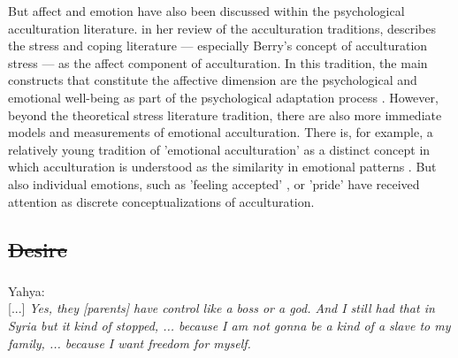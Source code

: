 \documentclass[man, 12pt, a4paper, mask]{apa7}
\providecommand{\DIFaddtex}[1]{{\protect\color{blue}\uwave{#1}}} %
\providecommand{\DIFdeltex}[1]{{\protect\color{red}\sout{#1}}}                      %
\providecommand{\DIFaddbegin}{} %
\providecommand{\DIFaddend}{} %
\providecommand{\DIFdelbegin}{} %
\providecommand{\DIFdelend}{} %
\providecommand{\DIFadd}[1]{\texorpdfstring{\DIFaddtex{#1}}{#1}} %
\providecommand{\DIFdel}[1]{\texorpdfstring{\DIFdeltex{#1}}{}} %
\newcommand{\DIFscaledelfig}{0.5}
\newlength{\DIFdelgraphicswidth} %
\newlength{\DIFdelgraphicsheight} %
\newcommand{\DIFaddincludegraphics}[2][]{{\color{blue}\fbox{\DIFOincludegraphics[#1]{#2}}}} %
\newcommand{\DIFdelincludegraphics}[2][]{%
\sbox{\DIFdelgraphicsbox}{\DIFOincludegraphics[#1]{#2}}%
\settoboxwidth{\DIFdelgraphicswidth}{\DIFdelgraphicsbox} %
\settoboxtotalheight{\DIFdelgraphicsheight}{\DIFdelgraphicsbox} %
\scalebox{\DIFscaledelfig}{%
\parbox[b]{\DIFdelgraphicswidth}{\usebox{\DIFdelgraphicsbox}\\[-\baselineskip] \rule{\DIFdelgraphicswidth}{0em}}\llap{\resizebox{\DIFdelgraphicswidth}{\DIFdelgraphicsheight}{%
\setlength{\unitlength}{\DIFdelgraphicswidth}%
\begin{picture}(1,1)%
\thicklines\linethickness{2pt} %
{\color[rgb]{1,0,0}\put(0,0){\framebox(1,1){}}}%
{\color[rgb]{1,0,0}\put(0,0){\line( 1,1){1}}}%
{\color[rgb]{1,0,0}\put(0,1){\line(1,-1){1}}}%
\end{picture}%
}\hspace*{3pt}}} %
} %
\DeclareRobustCommand{\DIFaddbegin}{\DIFOaddbegin \let\includegraphics\DIFaddincludegraphics} %
\DeclareRobustCommand{\DIFaddend}{\DIFOaddend \let\includegraphics\DIFOincludegraphics} %
\DeclareRobustCommand{\DIFdelbegin}{\DIFOdelbegin \let\includegraphics\DIFdelincludegraphics} %
\DeclareRobustCommand{\DIFdelend}{\DIFOaddend \let\includegraphics\DIFOincludegraphics} %
\begin{document}
But affect and emotion have also been discussed within the psychological acculturation literature. \citet{Ward2001} in her review of the acculturation traditions, describes the stress and coping literature --- especially Berry's concept of acculturation stress \citep{Berry1997b} --- as the affect component of acculturation. In this tradition, the main constructs that constitute the affective dimension are the psychological and emotional well-being as part of the psychological adaptation process \citep[including, for example, life satisfaction and depression;][]{Ward2019}. However, beyond the theoretical stress literature tradition, there are also more immediate models and measurements of emotional acculturation. There is, for example, a relatively young tradition of 'emotional acculturation' as a distinct concept in which acculturation is understood as the similarity in emotional patterns \citep[see][for a review]{DeLeersnyder2017}. But also individual emotions, such as 'feeling accepted' \citep{Jasini2018}, or 'pride' \citep{Suinn1995} have received attention as discrete conceptualizations of acculturation. 

\DIFdelbegin \subsection{\DIFdel{Desire}}
\addtocounter{subsection}{-1}%
\DIFdelend \DIFaddbegin \subsubsection{\DIFadd{Desire}}
\DIFaddend \begin{displayquote}
    Yahya:\\
    {[...]} \textit{Yes, they [parents] have control like a boss or a god. And I still had that in Syria but it kind of stopped, ... because I am not gonna be a kind of a slave to my family, ... because I want freedom for myself.}
\end{displayquote}
\end{document}
